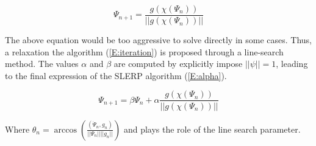 \begin{equation}  \label{E:iteration}
\Psi_{n+1}=\frac{g(\chi(\Psi_n))}{||g(\chi(\Psi_n))||}
\end{equation}

The above equation would be too aggressive to solve directly in some cases. Thus, a relaxation the algorithm (\ref{E:iteration}) is proposed through a line-search method. The values $\alpha$ and $\beta$ are computed by explicitly impose $||\psi||=1$, leading to the final expression of the SLERP algorithm (\ref{E:alpha}).


\begin{equation}  \label{E:alpha}
\Psi_{n+1}=\beta\Psi_n+\alpha\frac{g(\chi(\Psi_n))}{||g(\chi(\Psi_n))||}
\end{equation}

Where $ \theta_n = \arccos \left(\frac{(\dot{\Psi}_n,g_n)}{||\Psi_n||||g_n||}\right)$ and plays the role of the line search parameter.


\clearpage
















